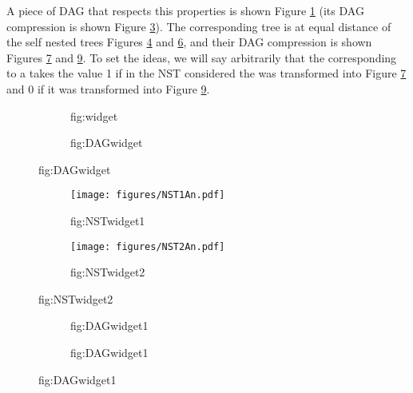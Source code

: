 A piece of DAG that respects this properties is shown Figure
\ref{fig:widget} (its DAG compression is shown Figure
\ref{fig:DAGwidget}). The corresponding tree is at equal distance of
the self nested trees Figures \ref{fig:NSTwidget1} and
\ref{fig:NSTwidget2}, and their DAG compression is shown Figures
\ref{fig:DAGwidget1} and \ref{fig:DAGwidget2}. To set the ideas, we
will say arbitrarily that the \variable corresponding to a \widget
takes the value 1 if in the NST considered the \widget was
transformed into Figure \ref{fig:DAGwidget1} and 0 if it was
transformed into Figure \ref{fig:DAGwidget2}.

\begin{figure}
 \begin{subfigure}[b]{0.45\textwidth}
    \centering
    \caption{fig:widget}
    \label{fig:widget}
  \end{subfigure}
  \quad
  \begin{subfigure}[b]{0.45\textwidth}
    \centering
    \caption{fig:DAGwidget}
    \label{fig:DAGwidget}
  \end{subfigure} 
\end{figure}

\begin{figure}
 \begin{subfigure}[b]{0.45\textwidth}
    \centering
    \texttt{[image: figures/NST1An.pdf]}
    \caption{fig:NSTwidget1}
    \label{fig:NSTwidget1}
  \end{subfigure}
  \quad
  \begin{subfigure}[b]{0.45\textwidth}
    \centering
    \texttt{[image: figures/NST2An.pdf]}
    \caption{fig:NSTwidget2}
    \label{fig:NSTwidget2}
  \end{subfigure} 
\end{figure}

\begin{figure}
 \begin{subfigure}[b]{0.45\textwidth}
    \centering
    \caption{fig:DAGwidget1}
    \label{fig:DAGwidget1}
  \end{subfigure}
  \quad
  \begin{subfigure}[b]{0.45\textwidth}
    \centering
    \caption{fig:DAGwidget1}
    \label{fig:DAGwidget2}
  \end{subfigure} 
\end{figure}


